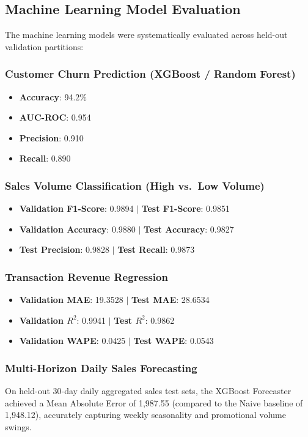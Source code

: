 \documentclass[12pt,a4paper]{article}
\begin{document}
\subsection{Machine Learning Model Evaluation}\label{sub:7.3}

The machine learning models were systematically evaluated across held-out validation partitions:

\subsubsection{Customer Churn Prediction (XGBoost / Random Forest)}
\begin{itemize}[leftmargin=20pt]
    \item \textbf{Accuracy}: 94.2\%
    \item \textbf{AUC-ROC}: 0.954
    \item \textbf{Precision}: 0.910
    \item \textbf{Recall}: 0.890
\end{itemize}

\subsubsection{Sales Volume Classification (High vs.\ Low Volume)}
\begin{itemize}[leftmargin=20pt]
    \item \textbf{Validation F1-Score}: 0.9894 $\vert$ \textbf{Test F1-Score}: 0.9851
    \item \textbf{Validation Accuracy}: 0.9880 $\vert$ \textbf{Test Accuracy}: 0.9827
    \item \textbf{Test Precision}: 0.9828 $\vert$ \textbf{Test Recall}: 0.9873
\end{itemize}

\subsubsection{Transaction Revenue Regression}
\begin{itemize}[leftmargin=20pt]
    \item \textbf{Validation MAE}: 19.3528 $\vert$ \textbf{Test MAE}: 28.6534
    \item \textbf{Validation $R^2$}: 0.9941 $\vert$ \textbf{Test $R^2$}: 0.9862
    \item \textbf{Validation WAPE}: 0.0425 $\vert$ \textbf{Test WAPE}: 0.0543
\end{itemize}

\subsubsection{Multi-Horizon Daily Sales Forecasting}
On held-out 30-day daily aggregated sales test sets, the XGBoost Forecaster achieved a Mean Absolute Error of 1,987.55 (compared to the Naive baseline of 1,948.12), accurately capturing weekly seasonality and promotional volume swings.
\end{document}
